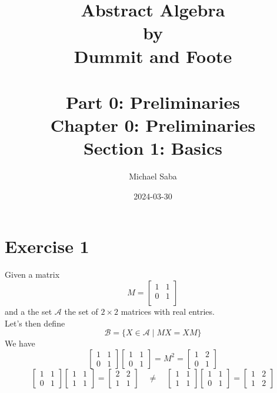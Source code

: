 \documentclass[12pt]{article}
\title{%
    \Huge Abstract Algebra \\
    \large by \\
    \Large Dummit and Foote \\~\\
    \huge Part 0: Preliminaries \\
    \LARGE Chapter 0: Preliminaries \\
    \Large Section 1: Basics
}
\date{2024-03-30}
\author{Michael Saba}
\begin{document}
    \maketitle
    \newpage
    \setlength{\parindent}{0pt}

    \section*{Exercise 1}
    Given a matrix 
    \[ M = \begin{bmatrix}
        1 & 1 \\
        0 & 1 \\
    \end{bmatrix} \]
    and a the set $\mathcal{A}$
    the set of $2 \times 2$ matrices with real entries.\\
    Let's then define 
    \[ \mathcal{B} = \{ X \in \mathcal{A} \mid MX = XM \} \]
    We have
    \[\begin{bmatrix}
        1 & 1 \\
        0 & 1
    \end{bmatrix}
    \begin{bmatrix}
        1 & 1 \\
        0 & 1
    \end{bmatrix}
    = M^2
    = \begin{bmatrix}
        1 & 2 \\
        0 & 1
    \end{bmatrix} \]
    \[ \begin{bmatrix}
        1 & 1 \\
        0 & 1
    \end{bmatrix}
    \begin{bmatrix}
        1 & 1 \\
        1 & 1
    \end{bmatrix}
    = \begin{bmatrix}
        2 & 2 \\
        1 & 1
    \end{bmatrix}
    \quad \neq \quad
    \begin{bmatrix}
        1 & 1 \\
        1 & 1
    \end{bmatrix}
    \begin{bmatrix}
        1 & 1 \\
        0 & 1
    \end{bmatrix}
    = \begin{bmatrix}
        1 & 2 \\
        1 & 2
    \end{bmatrix} \]
\end{document}
